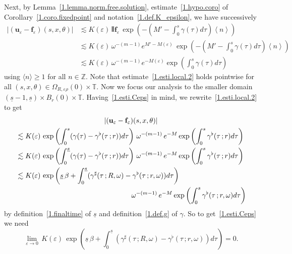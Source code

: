 \documentclass[10pt]{amsart}
\theoremstyle{definition}
\theoremstyle{plain}
\newcommand*\e{\varepsilon}
\newcommand*\Z{{\mathbb Z}}
\newcommand*\g{\gamma}
\newcommand{\ubf}{{\mathbf u}}
\newcommand*\f{{\mathbf f}}
\newcommand*\und{\underline}
\DeclarePairedDelimiter{\VERT}{|\mkern -1.6mu|\mkern -1.6mu|}{|\mkern -1.6mu|\mkern -1.6mu|}
\begin{document}
Next, by Lemma~\ref{1.lemma.norm.free.solution}, estimate~\eqref{1.hypo.coro} of Corollary~\ref{1.coro.fixedpoint} and notation~\eqref{1.def.K_epsilon}, we have successively
\begin{equation}
\begin{aligned}\label{1.esti.local.2}
|(\ubf_{\e}-\f_{\e})(s,x,\theta)| & \lesssim K(\e)\,\VERT{\f_{\e}}\,\exp\left(-\left(M'- \int_{0}^{s} \g(\tau) d\tau \right) \left<n\right> \right)\\
& \lesssim K(\e)\, \omega^{-(m-1)} e^{M'-M(\e)}\,\exp\left(-\left(M'- \int_{0}^{s} \g(\tau) d\tau \right) \left<n\right> \right)\\
& \lesssim K(\e)\, \omega^{-(m-1)} e^{-M(\e)} \exp\left(\int_{0}^{s} \g(\tau) d\tau \right) 
\end{aligned}
\end{equation}
using $\langle n \rangle \geq 1$ for all $n\in\Z$. Note that estimate~\eqref{1.esti.local.2} holds pointwise for all $(s,x,\theta)\in\Omega_{R,\e\rho}(0)\times\mathbb{T} $. Now we focus our analysis to the smaller domain $(\und{s} - 1, \und{s}) \times B_{r}(0) \times \mathbb{T}$. Having~\eqref{1.esti.Ceps} in mind, we rewrite~\eqref{1.esti.local.2} to get
\begin{multline}\label{1.esti.local}
|(\ubf_{\e}-\f_{\e})(s,x,\theta)| \\
\begin{aligned}
& \lesssim K(\e)\,\exp\left(\int_{0}^{s} (\g(\tau) - \g^{\flat}(\tau\,;r)) d\tau \right) \,\omega^{-(m-1)}\,e^{-M} \exp \left(\int_{0}^{s} \g^{\flat}(\tau\,;r) d\tau \right) \\
& \lesssim K(\e)\,\exp\left(\int_{0}^{\und{s}} (\g(\tau) - \g^{\flat}(\tau\,;r)) d\tau \right) \,\omega^{-(m-1)}\,e^{-M} \exp \left(\int_{0}^{s} \g^{\flat}(\tau\,;r) d\tau \right) \\
& \lesssim K(\e)\,\exp\left(\und{s}\,\beta + \int_{0}^{\und{s}} (\g^{\sharp}(\tau\,;R, \omega) - \g^{\flat}(\tau\,;r, \omega)) d\tau \right) \\
& \mkern 295mu \omega^{-(m-1)}\,e^{-M} \exp \left(\int_{0}^{s} \g^{\flat}(\tau\,;r, \omega) d\tau \right) 
\end{aligned}
\end{multline}
by definition~\eqref{1.finaltime} of $\und{s}$ and definition~\eqref{1.def.g} of $\g$. So to get~\eqref{1.esti.Ceps} we need
\[
\lim_{\e\to0} \,K(\e)\,\exp\left(\und{s}\,\beta + \int_{0}^{\und{s}} (\g^{\sharp}(\tau\,;R, \omega) - \g^{\flat}(\tau\,;r, \omega)) d\tau \right) = 0.
\]
\end{document}
